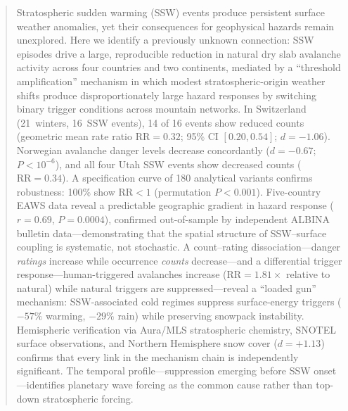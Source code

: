 \begin{abstract}
Stratospheric sudden warming (SSW) events produce persistent surface weather anomalies, yet their consequences for geophysical hazards remain unexplored.
Here we identify a previously unknown connection: SSW episodes drive a large, reproducible reduction in natural dry slab avalanche activity across four countries and two continents, mediated by a ``threshold amplification'' mechanism in which modest stratospheric-origin weather shifts produce disproportionately large hazard responses by switching binary trigger conditions across mountain networks.
In Switzerland (21~winters, 16~SSW events), 14 of 16 events show reduced counts (geometric mean rate ratio $\mathrm{RR} = 0.32$; 95\% CI $[0.20, 0.54]$; $d = -1.06$).
Norwegian avalanche danger levels decrease concordantly ($d = -0.67$; $P < 10^{-6}$), and all four Utah SSW events show decreased counts ($\mathrm{RR} = 0.34$).
A specification curve of 180 analytical variants confirms robustness: 100\% show $\mathrm{RR} < 1$ (permutation $P < 0.001$).
Five-country EAWS data reveal a predictable geographic gradient in hazard response ($r = 0.69$, $P = 0.0004$), confirmed out-of-sample by independent ALBINA bulletin data---demonstrating that the spatial structure of SSW--surface coupling is systematic, not stochastic.
A count--rating dissociation---danger \emph{ratings} increase while occurrence \emph{counts} decrease---and a differential trigger response---human-triggered avalanches increase ($\mathrm{RR} = 1.81\times$ relative to natural) while natural triggers are suppressed---reveal a ``loaded gun'' mechanism: SSW-associated cold regimes suppress surface-energy triggers ($-57\%$ warming, $-29\%$ rain) while preserving snowpack instability.
Hemispheric verification via Aura/MLS stratospheric chemistry, SNOTEL surface observations, and Northern Hemisphere snow cover ($d = +1.13$) confirms that every link in the mechanism chain is independently significant.
The temporal profile---suppression emerging before SSW onset---identifies planetary wave forcing as the common cause rather than top-down stratospheric forcing.
\end{abstract}

